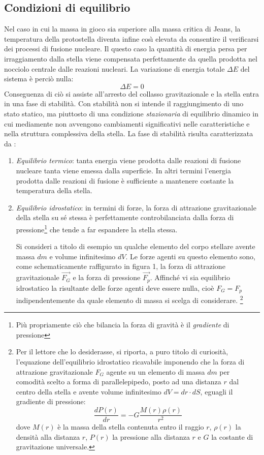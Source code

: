\subsection{Condizioni di equilibrio}\label{ce}
Nel caso in cui la massa in gioco sia superiore alla massa critica di Jeans, la temperatura della protostella diventa infine cos\`{\i}{} elevata da consentire il verificarsi dei processi di fusione nucleare.
Il questo caso la quantit\`{a} di energia persa per irraggiamento dalla stella viene compensata perfettamente da quella prodotta nel nocciolo centrale dalle reazioni nucleari. 
La variazione di energia totale $\Delta E$ del sistema è perciò nulla:
\begin{displaymath}
\Delta E = 0
\end{displaymath}
Conseguenza di ciò si assiste all'arresto del collasso gravitazionale e la stella entra in una fase di stabilit\`{a}.
Con stabilit\`{a} non si intende il raggiungimento di uno stato statico, ma piuttosto di una condizione \emph{stazionaria} di equilibrio dinamico in cui mediamente non avvengono cambiamenti significativi nelle caratteristiche e nella struttura complessiva della stella.
La fase di stabilit\`{a} risulta caratterizzata da \citep{hack}:
\begin{enumerate}
\item
\emph{Equilibrio termico}: tanta energia viene prodotta dalle reazioni di fusione nucleare tanta viene emessa dalla superficie. In altri termini l'energia prodotta dalle reazioni di fusione è sufficiente a mantenere costante la temperatura della stella.
\item
\emph{Equilibrio idrostatico}: in termini di forze, la forza di attrazione gravitazionale della stella su sé stessa è perfettamente controbilanciata dalla forza di pressione\footnote{Più propriamente ciò che bilancia la forza di gravit\`{a} è il \emph{gradiente} di pressione} che tende a far espandere la stella stessa.
\par
Si consideri a titolo di esempio un qualche elemento del corpo stellare avente massa $dm$ e volume infinitesimo $dV$. Le forze agenti su questo elemento sono, come schematicamente raffigurato in figura 1, la forza di attrazione gravitazionale $\vec{F_{G}}$ e la forza di pressione $\vec{F_{p}}$. Affinché vi sia equilibrio idrostatico la risultante delle forze agenti deve essere nulla, cioè $F_{G}=F_{p}$ indipendentemente da quale elemento di massa si scelga di considerare.
\footnote{Per il lettore che lo desiderasse, si riporta, a puro titolo di curiosit\`{a}, l'equazione dell'equilibrio idrostatico ricavabile imponendo che la forza di attrazione gravitazionale $F_{G}$ agente su un elemento di massa $dm$ per comodit\`{a} scelto a forma di parallelepipedo, posto ad una distanza $r$ dal centro della stella e avente volume infinitesimo $dV=dr \cdot dS$, eguagli il gradiente di pressione:
\begin{displaymath}\nonumber
\frac{dP(r)}{dr}=-G \frac{M(r) \rho(r)}{r^{2}}
\end{displaymath}
dove $M(r)$ è la massa della stella contenuta entro il raggio $r$, $\rho(r)$ la densit\`{a} alla distanza $r$, $P(r)$ la pressione alla distanza $r$ e $G$ la costante di gravitazione universale.
}
\end{enumerate}
